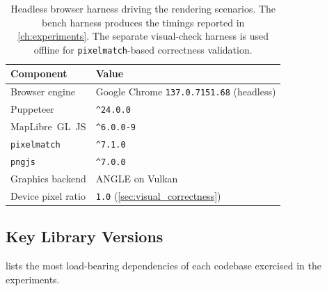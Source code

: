 \begin{table}[htbp]
	\centering
	\begin{tabular}{@{}l l@{}}
		\toprule
		\textbf{Component} & \textbf{Value} \\
		\midrule
		Browser engine               & Google Chrome \texttt{137.0.7151.68} (headless) \\
		Puppeteer                    & \texttt{\textasciicircum24.0.0} \\
		MapLibre~GL~JS               & \texttt{\textasciicircum6.0.0-9} \\
		\texttt{pixelmatch}          & \texttt{\textasciicircum7.1.0} \\
		\texttt{pngjs}               & \texttt{\textasciicircum7.0.0} \\
		Graphics backend             & ANGLE on Vulkan \\
		Device pixel ratio           & \texttt{1.0} (\cref{sec:visual_correctness}) \\
		\bottomrule
	\end{tabular}
	\caption{
Headless browser harness driving the rendering scenarios.
The bench harness produces the timings reported in \cref{ch:experiments}.
The separate visual-check harness is used offline for \texttt{pixelmatch}-based correctness validation.}
	\label{tab:bench_browser}
\end{table}

\clearpage

\subsection{Key Library Versions}\label{app:bench_libs}

 lists the most load-bearing dependencies of each codebase exercised in the experiments.

